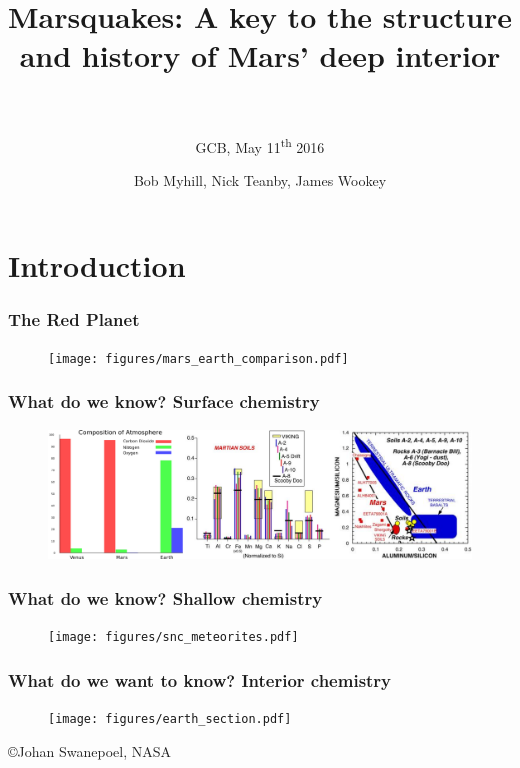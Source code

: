 \documentclass[compress,framenumber]{beamer}
\title{Marsquakes: A key to the structure and history of Mars' deep interior
\\$\,$}
\subtitle{GCB, May 11\textsuperscript{th} 2016}
\author{\hfill{Bob Myhill, Nick Teanby, James Wookey}}
\begin{document}
\begin{frame} 
\titlepage
\vspace{-1.0em}
\end{frame}


\section{Introduction}

\begin{frame}
  \frametitle{The Red Planet}
  \vspace{-2.0em}
  \begin{figure}
    \texttt{[image: figures/mars\_earth\_comparison.pdf]}
  \end{figure}

\end{frame}

\begin{frame}
  \frametitle{What do we know? Surface chemistry}
  \vspace{-2.0em}
  \begin{figure}
    \includegraphics[width=1.00\linewidth]{figures/mars_composition.pdf}
  \end{figure}
\end{frame}

\begin{frame}
  \frametitle{What do we know? Shallow chemistry}
  \vspace{-2.0em}
  \begin{figure}
    \texttt{[image: figures/snc\_meteorites.pdf]}
  \end{figure}
\end{frame}

\begin{frame}
  \frametitle{What do we want to know? Interior chemistry}
  \vspace{-2.0em}
  \begin{figure}
    \texttt{[image: figures/earth\_section.pdf]}
  \end{figure}
  \vspace{-1.0em}
  \hfill \copyright Johan Swanepoel, NASA
\end{frame}
\end{document}
